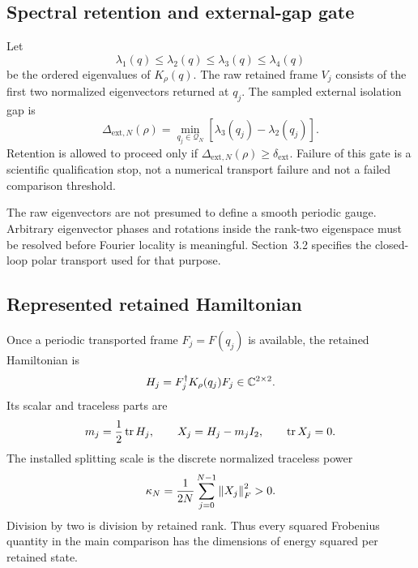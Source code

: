 \subsection{Spectral retention and external-gap gate}

Let
\begin{equation}
 \lambda_1(q)\le\lambda_2(q)\le\lambda_3(q)\le\lambda_4(q)
\end{equation}
be the ordered eigenvalues of $K_\rho(q)$.  The raw retained frame $V_j$ consists of the
first two normalized eigenvectors returned at $q_j$.  The sampled external isolation
gap is
\begin{equation}
 \Delta_{\mathrm{ext},N}(\rho)
 =\min_{q_j\in\mathcal Q_N}\left[\lambda_3(q_j)-\lambda_2(q_j)\right].
 \label{eq:external-gap}
\end{equation}
Retention is allowed to proceed only if
$\Delta_{\mathrm{ext},N}(\rho)\ge\delta_{\mathrm{ext}}$.  Failure of this gate is a
scientific qualification stop, not a numerical transport failure and not a failed
comparison threshold.

The raw eigenvectors are not presumed to define a smooth periodic gauge.  Arbitrary
eigenvector phases and rotations inside the rank-two eigenspace must be resolved before
Fourier locality is meaningful.  Section~3.2 specifies the closed-loop polar transport
used for that purpose.

\subsection{Represented retained Hamiltonian}

Once a periodic transported frame $F_j=F(q_j)$ is available, the retained Hamiltonian is
\begin{equation}
 H_j=F_j^\dagger K_\rho(q_j)F_j\in\mathbb C^{2\times2}.
 \label{eq:retained-hamiltonian}
\end{equation}
Its scalar and traceless parts are
\begin{equation}
 m_j=\frac12\operatorname{tr} H_j,
 \qquad X_j=H_j-m_jI_2,
 \qquad \operatorname{tr} X_j=0.
 \label{eq:trace-traceless}
\end{equation}
The installed splitting scale is the discrete normalized traceless power
\begin{equation}
 \kappa_N=\frac{1}{2N}\sum_{j=0}^{N-1}\left\lVert X_j\right\rVert_F^2>0.
 \label{eq:splitting-scale}
\end{equation}
Division by two is division by retained rank.  Thus every squared Frobenius quantity in
the main comparison has the dimensions of energy squared per retained state.

